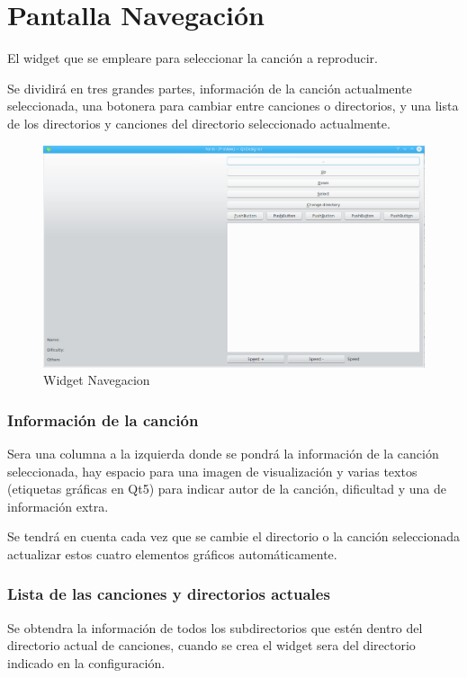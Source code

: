 \documentclass[a4paper,11pt,oneside]{book}
\begin{document}
\section{Pantalla Navegación}
El widget que se empleare para seleccionar la canción a reproducir.

Se dividirá en tres grandes partes, información de la canción actualmente seleccionada, una botonera para cambiar entre canciones o directorios, y una lista de los directorios y canciones del directorio seleccionado actualmente.

\begin{figure}[H]
\begin{center}
\includegraphics[scale=0.4]{Imagenes/WidgetNavegacion.png}
\caption{Widget Navegacion}
\label{Widget Navegacion}
\end{center}
\end{figure}

\subsubsection{Información de la canción}
Sera una columna a la izquierda donde se pondrá la información de la canción seleccionada, hay espacio para una imagen de visualización y varias textos (etiquetas gráficas en Qt5) para indicar autor de la canción, dificultad y una de información extra.

Se tendrá en cuenta cada vez que se cambie el directorio o la canción seleccionada actualizar estos cuatro elementos gráficos automáticamente.

\subsubsection{Lista de las canciones y directorios actuales}
Se obtendra la información de todos los subdirectorios que estén dentro del directorio actual de canciones, cuando se crea el widget sera del directorio indicado en la configuración.
\end{document}
